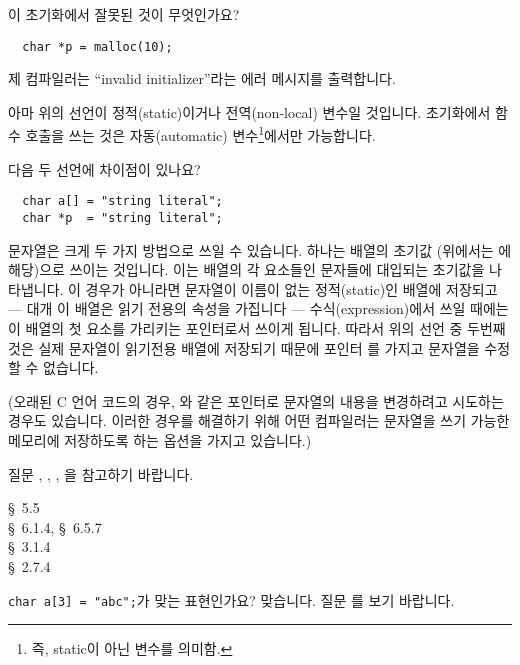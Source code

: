 \begin{faq}
	이 초기화에서 잘못된 것이 무엇인가요?

\begin{verbatim}
  char *p = malloc(10);
\end{verbatim}

	\noindent 제 컴파일러는 ``invalid initializer''라는 에러 메시지를
	출력합니다.

\A
	아마 위의 선언이 정적(static)이거나 전역(non-local) 변수일 것입니다.
	초기화에서 함수 호출을 쓰는 것은 자동(automatic)
	변수\footnote{즉, static이 아닌 변수를 의미함.}에서만 가능합니다.
\end{faq}

\begin{faq}
	다음 두 선언에 차이점이 있나요?

\begin{verbatim}
  char a[] = "string literal";
  char *p  = "string literal";
\end{verbatim}

\A
	문자열은 크게 두 가지 방법으로 쓰일 수 있습니다.  하나는 배열의
	초기값 (위에서는 에 해당)으로 쓰이는 것입니다.  이는
	배열의 각 요소들인 문자들에 대입되는 초기값을 나타냅니다.  이 경우가
	아니라면 문자열이 이름이 없는 정적(static)인 배열에 저장되고 ---
	대개 이 배열은 읽기 전용의 속성을 가집니다  --- 수식(expression)에서
	쓰일 때에는 이 배열의 첫 요소를 가리키는 포인터로서 쓰이게 됩니다.  
	따라서 위의 선언 중 두번째 것은 실제 문자열이 읽기전용 배열에 저장되기
	때문에 포인터 를 가지고 문자열을 수정할 수 없습니다.

	(오래된 C 언어 코드의 경우, 와 같은 포인터로 문자열의 내용을
	변경하려고 시도하는 경우도 있습니다.  이러한 경우를 해결하기 위해
	어떤 컴파일러는 문자열을 쓰기 가능한 메모리에 저장하도록 하는 옵션을
	가지고 있습니다.)

	질문 , , , 을 참고하기 바랍니다.

\R	
	\cite{kr2} \S\ 5.5  \\
	\cite{c89} \S\ 6.1.4, \S\ 6.5.7 \\
	\cite{rationale} \S\ 3.1.4 \\
	\cite{hs} \S\ 2.7.4 
\end{faq}

\begin{faq}
        \verb+char a[3] = "abc";+가 맞는 표현인가요?
\A
        맞습니다. 질문 를 보기 바랍니다.
\end{faq}

